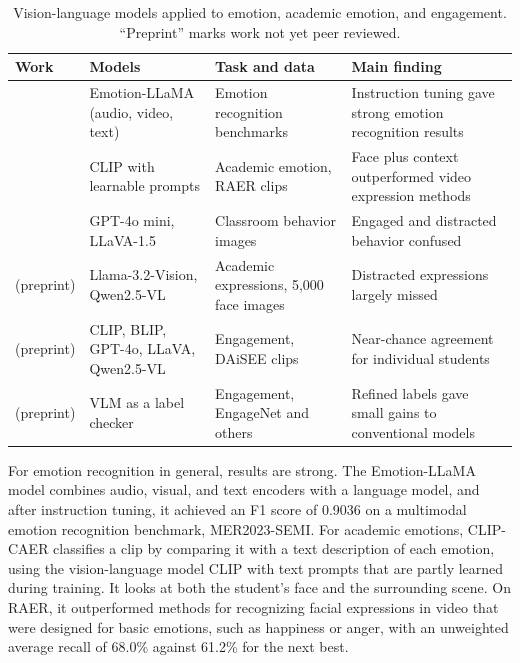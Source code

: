 \begin{table}[t]
   \centering
   \caption[Vision-language models applied to students' states]{Vision-language models applied to emotion, academic emotion, and engagement. ``Preprint'' marks work not yet peer reviewed.}
   \label{tab:rw-vlm}
   \small
   \begin{tabular}{L{3.0cm}L{3.2cm}L{2.6cm}L{3.8cm}}
      \toprule
      Work & Models & Task and data & Main finding \\
      \midrule
       & Emotion-LLaMA (audio, video, text) & Emotion recognition benchmarks & Instruction tuning gave strong emotion recognition results \\
       & CLIP with learnable prompts & Academic emotion, RAER clips & Face plus context outperformed video expression methods \\
       & GPT-4o mini, LLaVA-1.5 & Classroom behavior images & Engaged and distracted behavior confused \\
       (preprint) & Llama-3.2-Vision, Qwen2.5-VL & Academic expressions, 5,000 face images & Distracted expressions largely missed \\
       (preprint) & CLIP, BLIP, GPT-4o, LLaVA, Qwen2.5-VL & Engagement, DAiSEE clips & Near-chance agreement for individual students \\
       (preprint) & VLM as a label checker & Engagement, EngageNet and others & Refined labels gave small gains to conventional models \\
      \bottomrule
   \end{tabular}
\end{table}

For emotion recognition in general, results are strong. The Emotion-LLaMA model \cite{cheng2024} combines audio, visual, and text encoders with a language model, and after instruction tuning, it achieved an F1 score of 0.9036 on a multimodal emotion recognition benchmark, MER2023-SEMI. For academic emotions, CLIP-CAER \cite{zhao2025} classifies a clip by comparing it with a text description of each emotion, using the vision-language model CLIP with text prompts that are partly learned during training. It looks at both the student's face and the surrounding scene. On RAER, it outperformed methods for recognizing facial expressions in video that were designed for basic emotions, such as happiness or anger, with an unweighted average recall of 68.0\% against 61.2\% for the next best.

